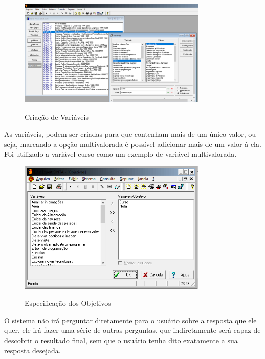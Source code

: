  
 \begin{figure}[H]
    \centering
    \caption{Criação de Variáveis}
    \includegraphics[width=0.8\textwidth]{variaveis.PNG}
    \label{variaveis}
\end{figure}
 As variáveis, podem ser criadas para que contenham mais de um único valor, ou seja, marcando a opção multivalorada é possível adicionar mais de um valor à ela. Foi utilizado a variável curso como um exemplo de variável multivalorada.
 
 
  \begin{figure}[H]
    \centering
    \caption{Especificação dos Objetivos}
    \includegraphics[width=0.8\textwidth]{objetivos.PNG}
    \label{objetivos}
\end{figure}


O sistema não irá perguntar diretamente para o usuário sobre a resposta que ele quer, ele irá fazer uma série de outras perguntas, que indiretamente será capaz de descobrir o resultado final, sem que o usuário tenha dito exatamente a sua resposta desejada.


